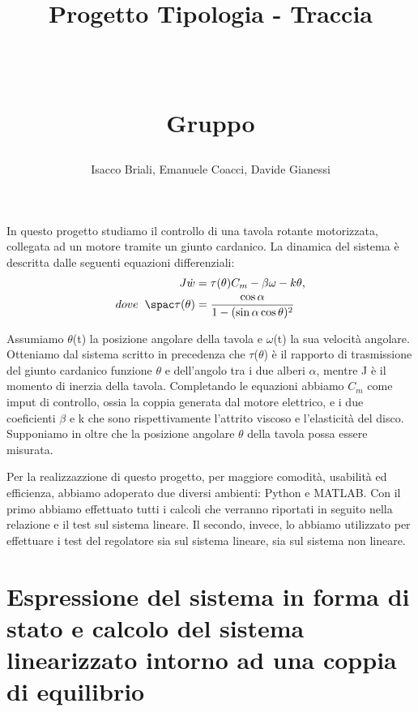 \documentclass[a4paper, 11pt]{article}
\title{ \vspace{-1in}
		\huge \strut \coursename \strut 
		\\
		\Large  \strut Progetto Tipologia \tipology - Traccia \trace 
		\\
		\Large  \strut \projectname\strut
		\\
		\Large  \strut Gruppo \group\strut
		\vspace{-0.4cm}
}
\author{ Isacco Briali, Emanuele Coacci, Davide Gianessi}
\date{}
\begin{document}
\maketitle
\vspace{-0.5cm}
In questo progetto studiamo il controllo di una tavola rotante motorizzata, collegata ad un motore tramite un giunto cardanico. La dinamica del sistema è descritta dalle seguenti equazioni differenziali:
%
\begin{subequations}\label{eq:system}
\begin{align}
	    J\dot{w} &= \tau(\theta)C_m - \beta\omega - k\theta,
        \\
        dove \hspace{0,2cm} \spac \tau(\theta) &= \frac{\cos{\alpha}}{1-(\sin{\alpha\cos{\theta)^2}}}
\end{align}
\end{subequations}
%

Assumiamo $\theta$(t) la posizione angolare della tavola e $\omega$(t) la sua velocità angolare. Otteniamo dal sistema scritto in precedenza che $\tau$($\theta$) è il rapporto di trasmissione del giunto cardanico funzione $\theta$ e dell'angolo tra i due alberi $\alpha$, mentre J è il momento di inerzia della tavola. Completando le equazioni abbiamo $C_m$ come imput di controllo, ossia la coppia generata dal motore elettrico, e i due coeficienti $\beta$ e k che sono rispettivamente l'attrito viscoso e l'elasticità del disco. Supponiamo in oltre che la posizione angolare $\theta$ della tavola possa essere misurata.

Per la realizzazzione di questo progetto, per maggiore comodità, usabilità ed efficienza, abbiamo adoperato due diversi ambienti: Python e MATLAB. Con il primo abbiamo effettuato tutti i calcoli che verranno riportati in seguito nella relazione e il test sul sistema lineare. Il secondo, invece, lo abbiamo utilizzato per effettuare i test del regolatore sia sul sistema lineare, sia sul sistema non lineare.

\section{Espressione del sistema in forma di stato e calcolo del sistema linearizzato intorno ad una coppia di equilibrio}
\end{document}
